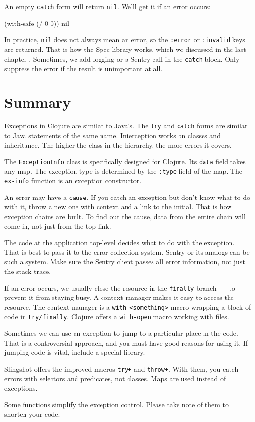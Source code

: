 \noindent
An empty \verb|catch| form will return \verb|nil|. We'll get it if an error occurs:

\begin{clojure}
(with-safe (/ 0 0))
nil
\end{clojure}

In practice, \verb|nil| does not always mean an error, so the \verb|:error| or \verb|:invalid| keys are returned. That is how the Spec library works, which we discussed in the last chapter . Sometimes, we add logging or a Sentry call in the \verb|catch| block. Only suppress the error if the result is unimportant at all.

\section{Summary}

Exceptions in Clojure are similar to Java's. The \verb|try| and \verb|catch| forms are similar to Java statements of the same name. Interception works on classes and inheritance. The higher the class in the hierarchy, the more errors it covers.

The \verb|ExceptionInfo| class is specifically designed for Clojure. Its \verb|data| field takes any map. The exception type is determined by the \verb|:type| field of the map. The \verb|ex-info| function is an exception constructor.

An error may have a \verb|cause|. If you catch an exception but don't know what to do with it, throw a new one with context and a link to the initial. That is how exception chains are built. To find out the cause, data from the entire chain will come in, not just from the top link.

The code at the application top-level decides what to do with the exception.
That is best to pass it to the error collection system. Sentry or its analogs can be such a system. Make sure the Sentry client passes all error information, not just the stack trace.

If an error occurs, we usually close the resource in the \verb|finally| branch~--- to prevent it from staying busy. A context manager makes it easy to access the resource. The context manager is a \verb|with-<something>| macro wrapping a block of code in \verb|try/finally|. Clojure offers a \verb|with-open| macro working with files.

Sometimes we can use an exception to jump to a particular place in the code. That is a controversial approach, and you must have good reasons for using it. If jumping code is vital, include a special library.

Slingshot offers the improved macros \verb|try+| and \verb|throw+|. With them, you catch errors with selectors and predicates, not classes. Maps are used instead of exceptions.

Some functions simplify the exception control. Please take note of them to shorten your code.
